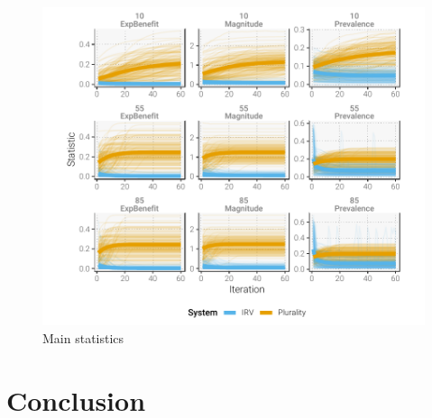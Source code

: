 \documentclass[12pt, letter]{article}
\begin{document}
\begin{figure}[]
	\centering
	\includegraphics[width = \textwidth]{../output/figures/iterated_complete}
	\caption{Main statistics}
	\label{fig:main_stats}
\end{figure}

\section{Conclusion}
\end{document}
